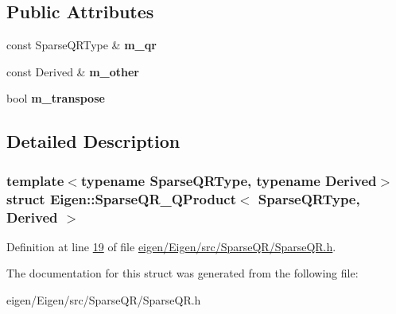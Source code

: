 \subsection*{Public Attributes}
\begin{DoxyCompactItemize}
\item 
\mbox{\label{struct_eigen_1_1_sparse_q_r___q_product_a89b566838f32318f52d97cbfae1da7be}} 
const Sparse\+Q\+R\+Type \& {\bfseries m\+\_\+qr}
\item 
\mbox{\label{struct_eigen_1_1_sparse_q_r___q_product_ae2dc57b66e6fc0e19047a980e45d5804}} 
const Derived \& {\bfseries m\+\_\+other}
\item 
\mbox{\label{struct_eigen_1_1_sparse_q_r___q_product_ab59e3f2d065f44d751ad02f3c12ddf30}} 
bool {\bfseries m\+\_\+transpose}
\end{DoxyCompactItemize}


\subsection{Detailed Description}
\subsubsection*{template$<$typename Sparse\+Q\+R\+Type, typename Derived$>$\newline
struct Eigen\+::\+Sparse\+Q\+R\+\_\+\+Q\+Product$<$ Sparse\+Q\+R\+Type, Derived $>$}



Definition at line \hyperlink{eigen_2_eigen_2src_2_sparse_q_r_2_sparse_q_r_8h_source_l00019}{19} of file \hyperlink{eigen_2_eigen_2src_2_sparse_q_r_2_sparse_q_r_8h_source}{eigen/\+Eigen/src/\+Sparse\+Q\+R/\+Sparse\+Q\+R.\+h}.



The documentation for this struct was generated from the following file\+:\begin{DoxyCompactItemize}
\item 
eigen/\+Eigen/src/\+Sparse\+Q\+R/\+Sparse\+Q\+R.\+h\end{DoxyCompactItemize}
